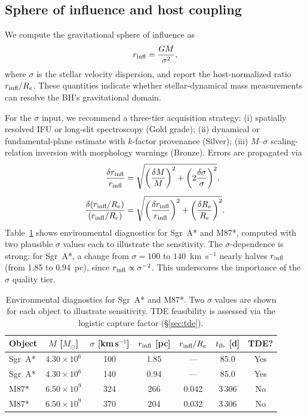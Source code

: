 \documentclass[11pt]{article}
\begin{document}
\subsection{Sphere of influence and host coupling}

We compute the gravitational sphere of influence as
\begin{equation}
r_{\rm infl} = \frac{GM}{\sigma^2},\label{eq:rinfl}
\end{equation}
where $\sigma$ is the stellar velocity dispersion, and report the host-normalized ratio $r_{\rm infl}/R_e$.
These quantities indicate whether stellar-dynamical mass measurements can resolve the BH's gravitational domain.

For the $\sigma$ input, we recommend a three-tier acquisition strategy:
(i) spatially resolved IFU or long-slit spectroscopy (Gold grade);
(ii) dynamical or fundamental-plane estimate with $k$-factor provenance (Silver);
(iii) $M$--$\sigma$ scaling-relation inversion with morphology warnings (Bronze).
Errors are propagated via
\begin{align}
\frac{\delta r_{\rm infl}}{r_{\rm infl}} &= \sqrt{\left(\frac{\delta M}{M}\right)^2 + \left(2\frac{\delta\sigma}{\sigma}\right)^2},\label{eq:err_rinfl}\\[4pt]
\frac{\delta(r_{\rm infl}/R_e)}{(r_{\rm infl}/R_e)} &= \sqrt{\left(\frac{\delta r_{\rm infl}}{r_{\rm infl}}\right)^2 + \left(\frac{\delta R_e}{R_e}\right)^2}.
\end{align}
Table~\ref{tab:env} shows environmental diagnostics for Sgr~A* and M87*, computed with two plausible $\sigma$ values each to illustrate the sensitivity.
The $\sigma$-dependence is strong: for Sgr~A*, a change from $\sigma=100$ to $140$~km~s$^{-1}$ nearly halves $r_{\rm infl}$ (from 1.85 to 0.94~pc), since $r_{\rm infl}\propto\sigma^{-2}$.
This underscores the importance of the $\sigma$ quality tier.

\begin{table}[htbp]
\centering
\caption{Environmental diagnostics for Sgr~A* and M87*.
Two $\sigma$ values are shown for each object to illustrate sensitivity.
TDE feasibility is assessed via the logistic capture factor (\S\ref{sec:tde}).}
\label{tab:env}
\begin{tabular}{@{}lcccccc@{}}
\toprule
Object & $M$ [$M_\odot$] & $\sigma$ [km\,s$^{-1}$] & $r_{\rm infl}$ [pc] & $r_{\rm infl}/R_e$ & $t_{\rm fb}$ [d] & TDE? \\
\midrule
Sgr~A* & $4.30\!\times\! 10^{6}$ & 100 & 1.85 & --- & 85.0 & Yes \\
Sgr~A* & $4.30\!\times\! 10^{6}$ & 140 & 0.94 & --- & 85.0 & Yes \\
M87*   & $6.50\!\times\! 10^{9}$ & 324 & 266 & 0.042 & 3\,306 & No \\
M87*   & $6.50\!\times\! 10^{9}$ & 370 & 204 & 0.032 & 3\,306 & No \\
\bottomrule
\end{tabular}
\end{table}
\end{document}
